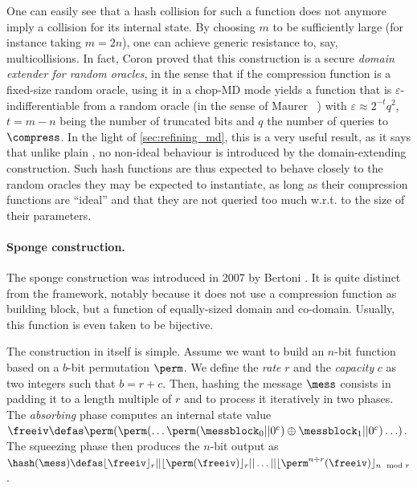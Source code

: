 One can easily see that a hash collision for such a function does not anymore imply a collision for its internal state. By choosing $m$ to be sufficiently large (for instance taking $m = 2n$),
one can achieve generic resistance to, say, multicollisions. In fact, Coron \etal proved that this construction is a secure \emph{domain extender for random oracles}, in the sense that
if the compression function is a fixed-size random oracle, using it in a chop-MD mode yields a function that is $\varepsilon$-indifferentiable from a random oracle (in the sense of Maurer \etal~\cite{DBLP:conf/tcc/MaurerRH04})
with $\varepsilon \approx 2^{-t}q^2$, $t = m - n$ being the number of truncated bits and $q$ the number of queries to $\compress$. In the light of \autoref{sec:refining_md}, this is a very useful result, as it
says that unlike plain \merkdam, no non-ideal behaviour is introduced by the domain-extending construction. Such hash functions are thus expected to behave closely to the random oracles they may be expected to instantiate, as long as
their compression functions are ``ideal'' and that they are not queried too much w.r.t. to the size of their parameters.

\paragraph{Sponge construction.} The sponge construction was introduced in 2007 by Bertoni \etal \cite{SpongeFunctions}. It is quite distinct from the \merkdam framework, notably because it does not use a compression
function as building block, but a function of equally-sized domain and co-domain. Usually, this function is even taken to be bijective.

The construction in itself is simple. Assume we want to build an $n$-bit function based on a $b$-bit permutation $\perm$. We define the \emph{rate} $r$ and the \emph{capacity} $c$ as two integers such that
$b = r + c$. Then, hashing the message $\mess$ consists in padding it to a length multiple of $r$ and to process it iteratively
in two phases. The \emph{absorbing} phase computes an internal state value $\freeiv \defas \perm(\perm(\ldots\perm(\messblock_0||0^c)\oplus\messblock_1||0^c)\ldots)$. The squeezing phase then produces the
$n$-bit output as $\hash(\mess) \defas \lfloor\freeiv\rfloor_r||\lfloor\perm(\freeiv)\rfloor_r||\ldots||\lfloor\perm^{n \div r}(\freeiv)\rfloor_{n \mod r}$.

